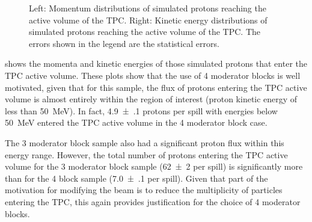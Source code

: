 \begin{figure}[h]
  \begin{minipage}[t]{.5\textwidth}
    \begin{adjustbox}{max totalsize=\textwidth, center}
      
    \end{adjustbox}
  \end{minipage}
  \hfill
  \begin{minipage}[t]{.5\textwidth}
    \begin{adjustbox}{max totalsize=\textwidth, center}
      
    \end{adjustbox}    
  \end{minipage}
  \caption[Momentum and kinetic energy distributions of simulated protons reaching the active volume of the TPC]{Left: Momentum distributions of simulated protons reaching the active volume of the TPC. Right: Kinetic energy distributions of simulated protons reaching the active volume of the TPC. The errors shown in the legend are the statistical errors.}
  \label{fig:protonTpcSim}
\end{figure}

 shows the momenta and kinetic energies of those simulated protons that enter the TPC active volume.
These plots show that the use of 4 moderator blocks is well motivated, given that for this sample, the flux of protons entering the TPC active volume is almost entirely within the region of interest (proton kinetic energy of less than \SI{50}{\mega\electronvolt}).
In fact, \num{4.9(1)} protons per spill with energies below \SI{50}{\mega\electronvolt} entered the TPC active volume in the 4 moderator block case.

The 3 moderator block sample also had a significant proton flux within this energy range.
However, the total number of protons entering the TPC active volume for the 3 moderator block sample (\num{62(2)} per spill) is significantly more than for the 4 block sample (\num{7.0(1)} per spill).
Given that part of the motivation for modifying the beam is to reduce the multiplicity of particles entering the TPC, this again provides justification for the choice of 4 moderator blocks.

